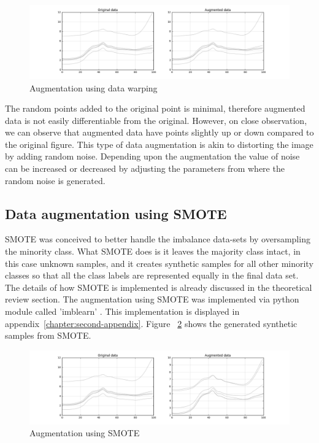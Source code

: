 \begin{figure}[ht]
	\begin{center}
		\includegraphics[width=\textwidth]{images/simple_augment.png}
		\caption{Augmentation using data warping}
		\label{fig:simple augmentation}
	\end{center}
\end{figure}


The random points added to the original point is minimal, therefore augmented data is not easily differentiable from the original. However, on close observation, we can observe that augmented data have points slightly up or down compared to the original figure. This type of data augmentation is akin to distorting the image by adding random noise. Depending upon the augmentation the value of noise can be increased or decreased by adjusting the parameters from where the random noise is generated. 

\subsection{Data augmentation using SMOTE} 
SMOTE was conceived to better handle the imbalance data-sets by oversampling the minority class. What SMOTE does is it leaves the majority class intact, in this case unknown samples, and it creates synthetic samples for all other minority classes so that all the class labels are represented equally in the final data set. The details of how SMOTE is implemented is already discussed in the theoretical review section. The augmentation using SMOTE was implemented via python module called 'imblearn' \citep{JMLR:v18:16-365}. This implementation is displayed in appendix~\ref{chapter:second-appendix}. Figure ~\ref{fig:SMOTE augmentation} shows the generated synthetic samples from SMOTE. 


\begin{figure}[ht]
	\begin{center}
		\includegraphics[width=\textwidth]{images/smote_augment.png}
		\caption{Augmentation using SMOTE}
		\label{fig:SMOTE augmentation}
	\end{center}
\end{figure}

